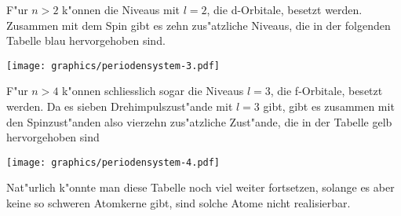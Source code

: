 F"ur $n>2$ k"onnen die Niveaus mit $l=2$, die d-Orbitale, besetzt werden.
Zusammen mit
dem Spin gibt es zehn zus"atzliche Niveaus, die in der folgenden Tabelle
blau hervorgehoben sind.
\begin{center}
\texttt{[image: graphics/periodensystem-3.pdf]}
\end{center}

F"ur $n>4$ k"onnen schliesslich sogar die Niveaus $l=3$, die
f-Orbitale, besetzt werden.
Da es sieben Drehimpulszust"ande mit $l=3$ gibt, gibt es zusammen mit den
Spinzust"anden also vierzehn zus"atzliche Zust"ande, die in
der Tabelle gelb hervorgehoben sind
\begin{center}
\texttt{[image: graphics/periodensystem-4.pdf]}
\end{center}
Nat"urlich k"onnte man diese Tabelle noch viel weiter fortsetzen,
solange es aber keine so schweren Atomkerne gibt, sind solche Atome
nicht realisierbar.

